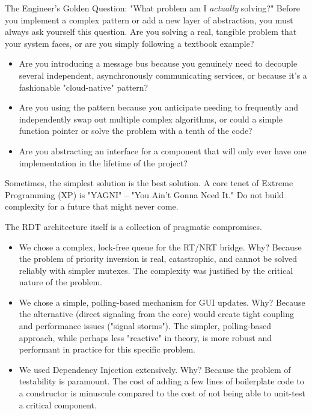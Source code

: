 \begin{principlebox}{The Engineer's Golden Question: "What problem am I \textit{actually} solving?"}
    Before you implement a complex pattern or add a new layer of abstraction, you must always ask yourself this question. Are you solving a real, tangible problem that your system faces, or are you simply following a textbook example?
    \begin{itemize}
        \item Are you introducing a message bus because you genuinely need to decouple several independent, asynchronously communicating services, or because it's a fashionable "cloud-native" pattern?
        \item Are you using the  pattern because you anticipate needing to frequently and independently swap out multiple complex algorithms, or could a simple function pointer or  solve the problem with a tenth of the code?
        \item Are you abstracting an interface for a component that will only ever have one implementation in the lifetime of the project?
    \end{itemize}
    Sometimes, the simplest solution is the best solution. A core tenet of Extreme Programming (XP) is "YAGNI" – "You Ain't Gonna Need It." Do not build complexity for a future that might never come.
\end{principlebox}

The RDT architecture itself is a collection of pragmatic compromises.
\begin{itemize}
    \item We chose a complex, lock-free queue for the RT/NRT bridge. Why? Because the problem of priority inversion is real, catastrophic, and cannot be solved reliably with simpler mutexes. The complexity was justified by the critical nature of the problem.
    \item We chose a simple, polling-based mechanism for GUI updates. Why? Because the alternative (direct signaling from the core) would create tight coupling and performance issues ("signal storms"). The simpler, polling-based approach, while perhaps less "reactive" in theory, is more robust and performant in practice for this specific problem.
    \item We used Dependency Injection extensively. Why? Because the problem of testability is paramount. The cost of adding a few lines of boilerplate code to a constructor is minuscule compared to the cost of not being able to unit-test a critical component.
\end{itemize}

